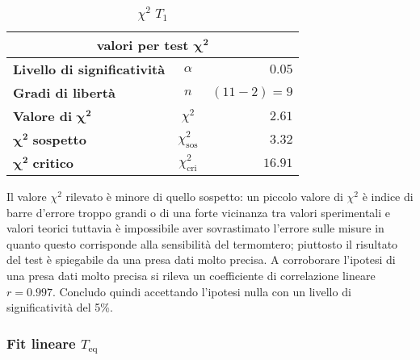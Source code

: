 \documentclass{article}
\begin{document}
	
	\begin{table}[H] \centering
		\begin{small}
			\begin{tabular}{@{}lcr@{}}\toprule
				\multicolumn{3}{c}{\textbf{valori per test} \(\boldsymbol{\chi^2}\)}\\ \midrule
				\textbf{Livello di significatività}		 &  \(\alpha\) &\(0.05\)\footnotemark \\  \hdashline
				\textbf{Gradi di libertà}		 & \(n\)  &\((11-2) = 9\) \\   \hdashline
				\textbf{Valore di} \(\boldsymbol{\chi^2}\)	 & \(\chi^2\)  &\(2.61\)\\  \hdashline
				\(\boldsymbol{\chi^2}\) \textbf{sospetto}		& \(\chi^2_{\text{sos}}\)  &\(3.32\)\\ \hdashline
				\(\boldsymbol{\chi^2}\) \textbf{critico}		& \(\chi^2_{\text{cri}}\)  &\(16.91\)\\ 
				\bottomrule
			\end{tabular}
		\end{small}
		\caption{\(\chi^2\) \(T_{1}\)}
	\end{table}
	
	\noindent
	Il valore \(\chi^2\) rilevato è minore di quello sospetto: un piccolo valore di \(\chi^2\) è indice di barre d'errore troppo grandi o di una forte vicinanza tra valori sperimentali e valori teorici tuttavia è impossibile aver sovrastimato l'errore sulle misure in quanto questo corrisponde alla sensibilità del termomtero; piuttosto il risultato del test è spiegabile da una presa dati molto precisa. A corroborare l'ipotesi di una presa dati molto precisa si rileva un coefficiente di correlazione lineare \(r = 0.997\). Concludo quindi accettando l'ipotesi nulla con un livello di significatività del 5\%.
	
	\subsubsection{Fit lineare \(T_{\text{eq}}\)}
	
\end{document}
